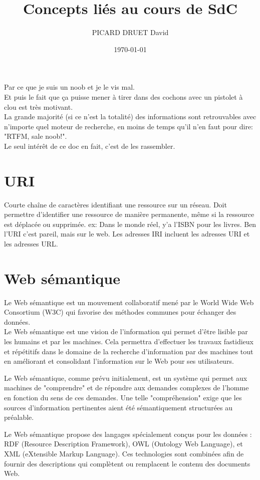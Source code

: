 \documentclass[11pt,a4paper]{article}
\title{Concepts liés au cours de SdC}
\author{PICARD DRUET David}
\date{\today}
\begin{document}
\maketitle
\begin{center}
Par ce que je suis un noob et je le vis mal.\\
Et puis le fait que ça puisse mener à tirer dans des cochons avec un pistolet à clou est très motivant.\\
La grande majorité (si ce n'est la totalité) des informations sont retrouvables avec n'importe quel moteur de recherche, en moins de temps qu'il n'en faut pour dire: "RTFM, sale noob!".\\
Le seul intérêt de ce doc en fait, c'est de les rassembler.\\
\end{center}


\section{URI}
Courte chaîne de caractères identifiant une ressource sur un réseau.
Doit permettre d'identifier une ressource de manière permanente, même si la ressource est déplacée ou supprimée.
ex: Dans le monde réel, y'a l'ISBN pour les livres. Ben l'URI c'est pareil, mais sur le web.
Les adresses IRI incluent les adresses URI et les adresses URL.

\section{Web sémantique}
Le Web sémantique est un mouvement collaboratif mené par le World Wide Web Consortium (W3C) qui favorise des méthodes communes pour échanger des données.\\
Le Web sémantique est une vision de l'information qui permet d'être lisible par les humains et par les machines. Cela permettra d'effectuer les travaux fastidieux et répétitifs dans le domaine de la recherche d'information par des machines tout en améliorant et consolidant l'information sur le Web pour ses utilisateurs.

Le Web sémantique, comme prévu initialement, est un système qui permet aux machines de "comprendre" et de répondre aux demandes complexes de l'homme en fonction du sens de ces demandes. Une telle "compréhension" exige que les sources d'information pertinentes aient été sémantiquement structurées au préalable.

Le Web sémantique propose des langages spécialement conçus pour les données : RDF (Resource Description Framework), OWL (Ontology Web Language), et XML (eXtensible Markup Language). Ces technologies sont combinées afin de fournir des descriptions qui complètent ou remplacent le contenu des documents Web.
\end{document}
